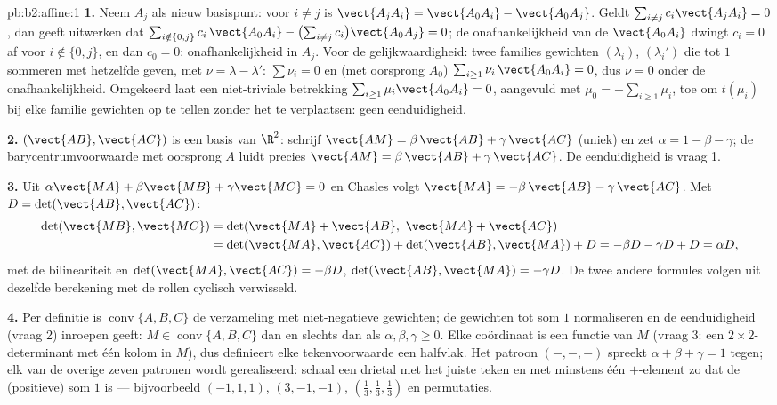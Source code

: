 \begin{solution}{pb:b2:affine:1}
\textbf{1.} Neem $A_j$ als nieuw basispunt: voor $i \neq j$ is
$\vect{A_jA_i} = \vect{A_0A_i} - \vect{A_0A_j}$. Geldt $\sum_{i
\neq j} c_i\vect{A_jA_i} = 0$, dan geeft uitwerken dat $\sum_{i
\notin \{0, j\}} c_i\,\vect{A_0A_i} - \bigl(\sum_{i\neq j}
c_i\bigr)\vect{A_0A_j} = 0$; de onafhankelijkheid van de
$\vect{A_0A_i}$ dwingt $c_i = 0$ af voor $i \notin \{0, j\}$, en
dan $c_0 = 0$: onafhankelijkheid in $A_j$. Voor de
gelijkwaardigheid: twee families gewichten $(\lambda_i)$,
$(\lambda_i')$ die tot $1$ sommeren met hetzelfde 
geven, met $\nu = \lambda - \lambda'$: $\sum\nu_i = 0$ en (met
oorsprong $A_0$) $\sum_{i \geq 1}\nu_i\,\vect{A_0A_i} = 0$, dus
$\nu = 0$ onder de onafhankelijkheid. Omgekeerd laat een
niet-triviale betrekking $\sum_{i\geq1}\mu_i \vect{A_0A_i} = 0$,
aangevuld met $\mu_0 = -\sum_{i\geq1} \mu_i$, toe om $t(\mu_i)$ bij
elke familie gewichten op te tellen zonder het  te
verplaatsen: geen eenduidigheid.

\textbf{2.} $(\vect{AB}, \vect{AC})$ is een basis van $\R^2$:
schrijf $\vect{AM} = \beta\,\vect{AB} + \gamma\,\vect{AC}$ (uniek)
en zet $\alpha = 1 - \beta - \gamma$; de barycentrumvoorwaarde met
oorsprong $A$ luidt precies $\vect{AM} = \beta\,\vect{AB} +
\gamma\,\vect{AC}$. De eenduidigheid is vraag 1.

\textbf{3.} Uit $\alpha\vect{MA} + \beta\vect{MB} +
\gamma\vect{MC} = 0$ en Chasles volgt $\vect{MA} = -\beta\,\vect{AB}
- \gamma\,\vect{AC}$. Met $D = \det(\vect{AB}, \vect{AC})$:
\begin{align*}
\det(\vect{MB}, \vect{MC})
&= \det(\vect{MA} + \vect{AB},\ \vect{MA} + \vect{AC})\\
&= \det(\vect{MA}, \vect{AC}) + \det(\vect{AB}, \vect{MA}) +
D = -\beta D - \gamma D + D = \alpha D,
\end{align*}
met de bilineariteit en $\det(\vect{MA}, \vect{AC}) = -\beta D$,
$\det(\vect{AB}, \vect{MA}) = -\gamma D$. De twee andere formules
volgen uit dezelfde berekening met de rollen cyclisch verwisseld.

\textbf{4.} Per definitie is $\operatorname{conv}\{A, B, C\}$ de
verzameling  met niet-negatieve gewichten; de gewichten
tot som $1$ normaliseren en de eenduidigheid (vraag 2) inroepen
geeft: $M \in \operatorname{conv}\{A,B,C\}$ dan en slechts dan als
$\alpha, \beta, \gamma \geq 0$. Elke coördinaat is een 
functie van $M$ (vraag 3: een $2\times2$-determinant met één kolom
 in $M$), dus definieert elke  tekenvoorwaarde een 
halfvlak. Het patroon $(-,-,-)$ spreekt $\alpha + \beta + \gamma =
1$ tegen; elk van de overige zeven patronen wordt gerealiseerd:
schaal een drietal met het juiste teken en met minstens één
$+$-element zo dat de (positieve) som $1$ is --- bijvoorbeeld
$(-1, 1, 1)$, $(3, -1, -1)$, $(\frac13, \frac13, \frac13)$ en
permutaties.


\end{solution}

